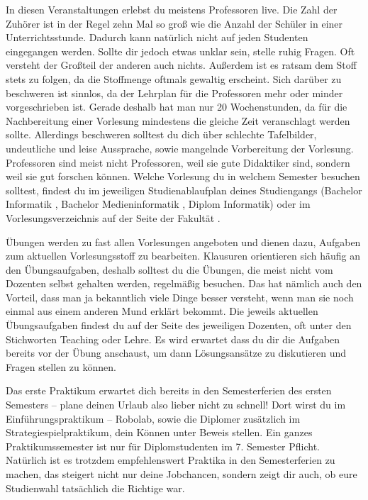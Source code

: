 In diesen Veranstaltungen erlebst du meistens Professoren live.
Die Zahl der Zuhörer ist in der Regel zehn Mal so groß wie die Anzahl der Schüler in einer Unterrichtsstunde. Dadurch kann natürlich nicht auf jeden Studenten eingegangen werden. Sollte dir jedoch etwas unklar sein, stelle ruhig Fragen. Oft versteht der Großteil der anderen auch nichts.
Außerdem ist es ratsam dem Stoff stets zu folgen, da die Stoffmenge oftmals gewaltig erscheint. Sich darüber zu beschweren ist sinnlos, da der Lehrplan für die Professoren mehr oder minder vorgeschrieben ist.
Gerade deshalb hat man nur 20 Wochenstunden, da für die Nachbereitung einer Vorlesung mindestens die gleiche Zeit veranschlagt werden sollte.
Allerdings beschweren solltest du dich über schlechte Tafelbilder, undeutliche und leise Aussprache, sowie mangelnde Vorbereitung der Vorlesung. 
Professoren sind meist nicht Professoren, weil sie gute Didaktiker sind, sondern weil sie gut forschen können.
Welche Vorlesung du in welchem Semester besuchen solltest, findest du im jeweiligen Studienablaufplan deines Studiengangs (Bachelor Informatik , Bachelor Medieninformatik , Diplom Informatik) oder im Vorlesungsverzeichnis auf der Seite der Fakultät .



Übungen werden zu fast allen Vorlesungen angeboten und dienen dazu, Aufgaben zum aktuellen Vorlesungsstoff zu bearbeiten. Klausuren orientieren sich häufig an den Übungsaufgaben, deshalb solltest du die Übungen, die meist nicht vom Dozenten selbst gehalten werden, regelmäßig besuchen.
Das hat nämlich auch den Vorteil, dass man ja bekanntlich viele Dinge besser versteht, wenn man sie noch einmal aus einem anderen Mund erklärt bekommt.
Die jeweils aktuellen Übungsaufgaben findest du auf der Seite des jeweiligen Dozenten, oft unter den Stichworten Teaching oder Lehre.
Es wird erwartet dass du dir die Aufgaben bereits vor der Übung anschaust, um dann Lösungsansätze zu diskutieren und Fragen stellen zu können.



Das erste Praktikum erwartet dich bereits in den Semesterferien des ersten Semesters – plane deinen Urlaub also lieber nicht zu schnell!
Dort wirst du im Einführungspraktikum – Robolab, sowie die Diplomer zusätzlich im Strategiespielpraktikum, dein Können unter Beweis stellen.
Ein ganzes Praktikumssemester ist nur für Diplomstudenten im 7. Semester Pflicht.
Natürlich ist es trotzdem empfehlenswert Praktika in den Semesterferien zu machen, das steigert nicht nur deine Jobchancen, sondern zeigt dir auch, ob eure Studienwahl tatsächlich die Richtige war.


